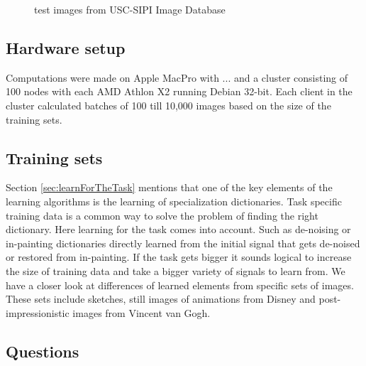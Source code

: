 \begin{figure}[h]
\hspace{5mm}
\caption{test images from USC-SIPI Image Database}
\label{fig:USC-SIPI}
\end{figure}

\subsection{Hardware setup} 
Computations were made on Apple MacPro with ... 
and a cluster consisting of 100 nodes with each AMD Athlon X2  running Debian 32-bit. Each client in the cluster calculated batches of
100 till 10,000 images based on the size of the training sets.

\subsection{Training sets}
Section \ref{sec:learnForTheTask} mentions that one of the key
elements of the learning algorithms is the learning of specialization
dictionaries. Task specific training data is a common way to solve the problem
of finding  the right dictionary. Here learning for the task comes into
account. Such as de-noising or in-painting dictionaries directly learned from
the initial signal that gets de-noised or restored from in-painting. If the task
gets bigger it sounds logical to increase the size of training data and take a
bigger variety of signals to learn from.  We have a closer look at differences
of learned elements from specific sets of images. These sets include sketches,
still images of animations from Disney and post-impressionistic images from
Vincent van Gogh.  

\subsection{Questions}
